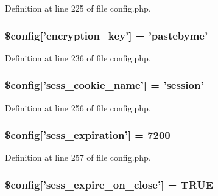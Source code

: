 Definition at line 225 of file config.\-php.

\hypertarget{application_2config_2config_8php_aefa5c9d6e7a454a6218df87e65796357}{
\subsubsection[{\$config}]{\setlength{\rightskip}{0pt plus 5cm}\$config\mbox{[}'encryption\-\_\-key'\mbox{]} = 'pastebyme'}}\label{application_2config_2config_8php_aefa5c9d6e7a454a6218df87e65796357}


Definition at line 236 of file config.\-php.

\hypertarget{application_2config_2config_8php_acaf9fb6347a03527f4b04198d6d8155b}{
\subsubsection[{\$config}]{\setlength{\rightskip}{0pt plus 5cm}\$config\mbox{[}'sess\-\_\-cookie\-\_\-name'\mbox{]} = 'session'}}\label{application_2config_2config_8php_acaf9fb6347a03527f4b04198d6d8155b}


Definition at line 256 of file config.\-php.

\hypertarget{application_2config_2config_8php_ad6a3784cad81991936465dcdac74b66a}{
\subsubsection[{\$config}]{\setlength{\rightskip}{0pt plus 5cm}\$config\mbox{[}'sess\-\_\-expiration'\mbox{]} = 7200}}\label{application_2config_2config_8php_ad6a3784cad81991936465dcdac74b66a}


Definition at line 257 of file config.\-php.

\hypertarget{application_2config_2config_8php_afe76a77df2001e739290d58bf6029036}{
\subsubsection[{\$config}]{\setlength{\rightskip}{0pt plus 5cm}\$config\mbox{[}'sess\-\_\-expire\-\_\-on\-\_\-close'\mbox{]} = T\-R\-U\-E}}\label{application_2config_2config_8php_afe76a77df2001e739290d58bf6029036}


